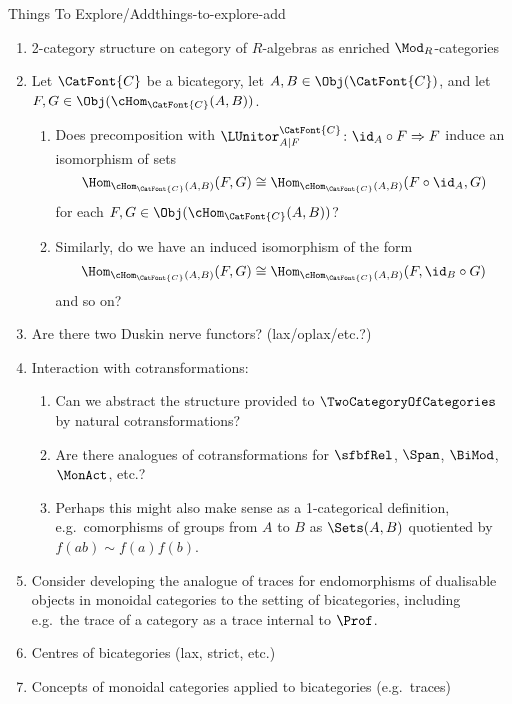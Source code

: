 \begin{remark}{Things To Explore/Add}{things-to-explore-add}
\begin{enumerate}
        \item 2-category structure on category of $R$-algebras as enriched $\Mod_{R}$-categories
        \item Let $\CatFont{C}$ be a bicategory, let $A,B\in\Obj(\CatFont{C})$, and let $F,G\in\Obj(\cHom_{\CatFont{C}}(A,B))$.
            \begin{enumerate}
                \item Does precomposition with $\LUnitor^{\CatFont{C}}_{A|F}\colon\id_{A}\circ F\Rightarrow F$ induce an isomorphism of sets
                    \[
                        \Hom_{\cHom_{\CatFont{C}}(A,B)}(F,G)%
                        \cong%
                        \Hom_{\cHom_{\CatFont{C}}(A,B)}(F\circ\id_{A},G)%
                    \]%
                    for each $F,G\in\Obj(\cHom_{\CatFont{C}}(A,B))$?
                \item Similarly, do we have an induced isomorphism of the form
                    \[
                        \Hom_{\cHom_{\CatFont{C}}(A,B)}(F,G)%
                        \cong%
                        \Hom_{\cHom_{\CatFont{C}}(A,B)}(F,\id_{B}\circ G)%
                    \]%
                    and so on?
            \end{enumerate}
        \item Are there two Duskin nerve functors? (lax/oplax/etc.?)
        \item Interaction with cotransformations:
            \begin{enumerate}
                \item Can we abstract the structure provided to $\TwoCategoryOfCategories$ by natural cotransformations?
                \item Are there analogues of cotransformations for $\sfbfRel$, $\Span$, $\BiMod$, $\MonAct$, etc.?
                \item Perhaps this might also make sense as a 1-categorical definition, e.g.\ comorphisms of groups from $A$ to $B$ as $\Sets(A,B)$ quotiented by $f(ab)\sim f(a)f(b)$.
            \end{enumerate}
        \item Consider developing the analogue of traces for endomorphisms of dualisable objects in monoidal categories to the setting of bicategories, including e.g.\ the trace of a category as a trace internal to $\Prof$.
        \item Centres of bicategories (lax, strict, etc.)
        \item Concepts of monoidal categories applied to bicategories (e.g.\ traces)

\end{enumerate}
\end{remark}
